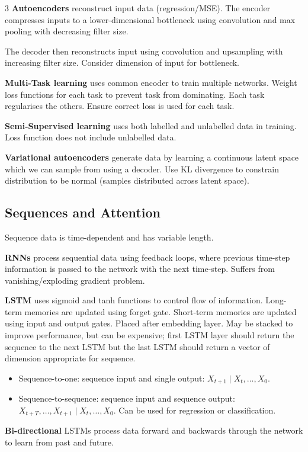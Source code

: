 \documentclass{article}
\begin{document}
\begin{multicols}{3}
    \textbf{Autoencoders} reconstruct input data (regression/MSE). The
    encoder compresses inputs to a lower-dimensional bottleneck using
    convolution and max pooling with decreasing filter size.

    The decoder then reconstructs input using convolution and
    upsampling with increasing filter size. Consider dimension of input
    for bottleneck.

    \textbf{Multi-Task learning} uses common encoder to train multiple
    networks. Weight loss functions for each task to prevent
    task from dominating. Each task regularises the others. Ensure
    correct loss is used for each task.

    \textbf{Semi-Supervised learning} uses both labelled and unlabelled
    data in training. Loss function does not include unlabelled data.

    \textbf{Variational autoencoders} generate data by learning a
    continuous latent space which we can sample from using a decoder.
    Use KL divergence to constrain distribution to be normal (samples
    distributed across latent space).
    \subsection{Sequences and Attention}
    Sequence data is time-dependent and has variable length.

    \textbf{RNNs} process sequential data using feedback loops, where
    previous time-step information is passed to the network with the
    next time-step. Suffers from vanishing/exploding gradient problem.

    \textbf{LSTM} uses sigmoid and tanh functions to control flow of
    information. Long-term memories are updated using forget gate.
    Short-term memories are updated using input and output gates.
    Placed after embedding layer. May be stacked to improve performance,
    but can be expensive; first LSTM layer should return the sequence to
    the next LSTM but the last LSTM should return a vector of dimension
    appropriate for sequence.
    \begin{itemize}
        \item Sequence-to-one: sequence input and single output: \(X_{t+1} \mid X_t, \ldots, X_0\).
        \item Sequence-to-sequence: sequence input and sequence output: \(X_{t+T}, \ldots, X_{t+1} \mid X_t, \ldots, X_0\).
            Can be used for regression or classification.
    \end{itemize}
    \textbf{Bi-directional} LSTMs process data forward and backwards
    through the network to learn from past and future.


\end{multicols}
\end{document}
